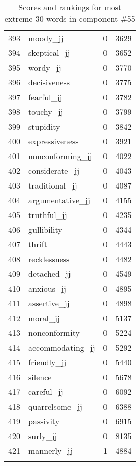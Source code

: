 \begin{longtable}[!htbp]{| rlr@{.}l |}
    393 & moody\_jj & 0 & 3629 \\
    394 & skeptical\_jj & 0 & 3652 \\
    395 & wordy\_jj & 0 & 3770 \\
    396 & decisiveness & 0 & 3775 \\
    397 & fearful\_jj & 0 & 3782 \\
    398 & touchy\_jj & 0 & 3799 \\
    399 & stupidity & 0 & 3842 \\
    400 & expressiveness & 0 & 3921 \\
    401 & nonconforming\_jj & 0 & 4022 \\
    402 & considerate\_jj & 0 & 4043 \\
    403 & traditional\_jj & 0 & 4087 \\
    404 & argumentative\_jj & 0 & 4155 \\
    405 & truthful\_jj & 0 & 4235 \\
    406 & gullibility & 0 & 4344 \\
    407 & thrift & 0 & 4443 \\
    408 & recklessness & 0 & 4482 \\
    409 & detached\_jj & 0 & 4549 \\
    410 & anxious\_jj & 0 & 4895 \\
    411 & assertive\_jj & 0 & 4898 \\
    412 & moral\_jj & 0 & 5137 \\
    413 & nonconformity & 0 & 5224 \\
    414 & accommodating\_jj & 0 & 5292 \\
    415 & friendly\_jj & 0 & 5440 \\
    416 & silence & 0 & 5678 \\
    417 & careful\_jj & 0 & 6092 \\
    418 & quarrelsome\_jj & 0 & 6388 \\
    419 & passivity & 0 & 6915 \\
    420 & surly\_jj & 0 & 8135 \\
    421 & mannerly\_jj & 1 & 4884 \\
    \hline
    \caption{Scores and rankings for most extreme 30 words in component \#55} \\
\end{longtable}
